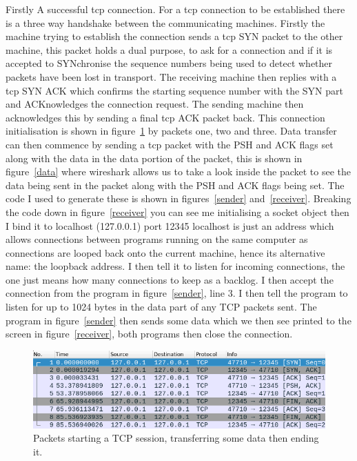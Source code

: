 \documentclass[titlepage]{article}
\begin{document}
Firstly A successful \gls{tcp} connection. For a \gls{tcp} connection to be established there is a 
three way handshake between the communicating machines. Firstly the machine trying to establish the 
connection sends a \gls{tcp} SYN packet to the other machine, this packet holds a dual purpose, to 
ask for a connection and if it is accepted to SYNchronise the sequence numbers being used to detect 
whether packets have been lost in transport. The receiving machine then replies with a \gls{tcp} SYN 
ACK which confirms the starting sequence number with the SYN part and ACKnowledges the connection 
request. The sending machine then acknowledges this by sending a final \gls{tcp} ACK packet back. 
This connection initialisation is shown in figure~\ref{data_transfer} by packets one, two and three. 
Data transfer can then commence by sending a \gls{tcp} packet with the PSH and ACK flags set along 
with the data in the data portion of the packet, this is shown in figure~\ref{data} where wireshark 
allows us to take a look inside the packet to see the data being sent in the packet along with the 
PSH and ACK flags being set. The code I used to generate these is shown in figures~\ref{sender} 
and~\ref{receiver}. Breaking the code down in figure~\ref{receiver} you can see me initialising a 
socket object then I bind it to localhost (127.0.0.1) port 12345 localhost is just an address which 
allows connections between programs running on the same computer as connections are looped back onto 
the current machine, hence its alternative name: the loopback address. I then tell it to listen for 
incoming connections, the one just means how many connections to keep as a backlog. I then accept 
the connection from the program in figure~\ref{sender}, line 3. I then tell the program to listen 
for up to 1024 bytes in the data part of any TCP packets sent. The program in figure~\ref{sender} 
then sends some data which we then see printed to the screen in figure~\ref{receiver}, both programs 
then close the connection.

\begin{figure}[H]
  \centering
  \includegraphics[width=\textwidth]{data_transfer.png}
  \caption{%
    Packets starting a TCP session, transferring some data then ending it.
  }\label{data_transfer}
\end{figure}
\end{document}
